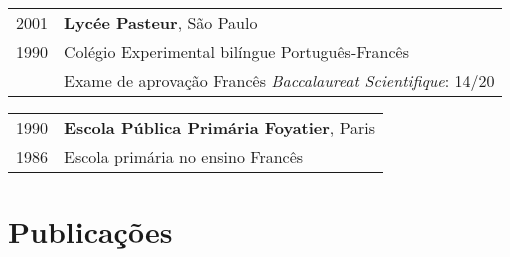 \documentclass[letter,10pt]{article}
\begin{document}
\begin{tabular}{p{2.5cm}l}
  \textsc{2001} & \textbf{Lycée Pasteur}, São Paulo\\
  \textsc{1990} & Colégio Experimental bilíngue Português-Francês\\
  & Exame de aprovação Francês \textit{Baccalaureat Scientifique}: 14/20
\end{tabular}

\begin{tabular}{p{2.5cm}l}
  \textsc{1990} & \textbf{Escola Pública Primária Foyatier}, Paris\\
  \textsc{1986} & Escola primária no ensino Francês\\
\end{tabular}

\section{Publicações}
\end{document}
